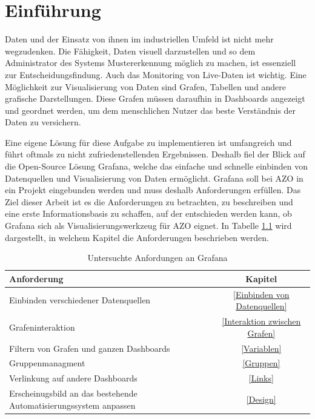 \documentclass[a4paper, 12pt, oneside]{scrbook}
\begin{document}
	\pagebreak
	\chapter{Einführung}
	
	\noindent Daten und der Einsatz von ihnen im industriellen Umfeld ist nicht mehr wegzudenken. Die Fähigkeit, Daten visuell darzustellen und so dem Administrator des Systems Mustererkennung möglich zu machen, ist essenziell zur Entscheidungsfindung. Auch das Monitoring von Live-Daten ist wichtig. 
	Eine Möglichkeit zur Visualisierung von Daten sind Grafen, Tabellen und andere grafische Darstellungen. Diese Grafen müssen daraufhin in Dashboards angezeigt und geordnet werden, um dem menschlichen Nutzer das beste Verständnis der Daten zu versichern.
	
	\noindent Eine eigene Lösung für diese Aufgabe zu implementieren ist umfangreich und führt oftmals zu nicht zufriedenstellenden Ergebnissen. Deshalb fiel der Blick auf die Open-Source Lösung Grafana, welche das einfache und schnelle einbinden von Datenquellen und Visualisierung von Daten ermöglicht. Grafana soll bei AZO in ein Projekt eingebunden werden und muss deshalb Anforderungen erfüllen. Das Ziel dieser Arbeit ist es die Anforderungen zu betrachten, zu beschreiben und eine erste Informationsbasis zu schaffen, auf der entschieden werden kann, ob Grafana sich als Visualisierungswerkzeug für AZO eignet. In Tabelle \ref{tab:aufgabenstellung} wird dargestellt, in welchem Kapitel die Anforderungen beschrieben werden.
	
	\begin{table} [H]
		\centering
			\begin{tabular}[W]{| l | c |}
				\hline
				\textbf{Anforderung} & \textbf{Kapitel} \\
				\hline
				Einbinden verschiedener Datenquellen & \ref{Einbinden von Datenquellen} \\
				\hline
				Grafeninteraktion & \ref{Interaktion zwischen Grafen} \\
				\hline
				Filtern von Grafen und ganzen Dashboards &  \ref{Variablen} \\
				\hline
				Gruppenmanagment &  \ref{Gruppen} \\
				\hline
				Verlinkung auf andere Dashboards &  \ref{Links} \\
				\hline
				Erscheinugsbild an das bestehende Automatisierungssystem anpassen &  \ref{Design} \\
				\hline
			\end{tabular}
		\caption{Untersuchte Anfordungen an Grafana}
		\label{tab:aufgabenstellung}
	\end{table}
	
\end{document}
